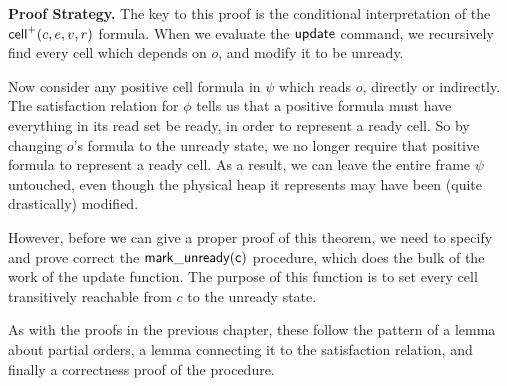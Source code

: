 \textbf{Proof Strategy.} The key to this proof is the conditional
interpretation of the $\mathsf{cell}^{+}({c}, {e}, {v}, {r})$ formula. When we evaluate
the $\mathsf{update}$ command, we recursively find every cell which
depends on $o$, and modify it to be unready.

Now consider any positive cell formula in $\psi$ which reads $o$,
directly or indirectly. The satisfaction relation for $\phi$ tells us
that a positive formula must have everything in its read set be
ready, in order to represent a ready cell. So by changing $o$'s
formula to the unready state, we no longer require that positive
formula to represent a ready cell. As a result, we can leave the
entire frame $\psi$ untouched, even though the physical heap it
represents may have been (quite drastically) modified. 

However, before we can give a proper proof of this theorem, we need to
specify and prove correct the $\mathsf{mark\_unready(c)}$ procedure,
which does the bulk of the work of the update function. The purpose of
this function is to set every cell transitively reachable from $c$ to
the unready state.

As with the proofs in the previous chapter, these follow the pattern 
of a lemma about partial orders, a lemma connecting it to the satisfaction
relation, and finally a correctness proof of the procedure. 


